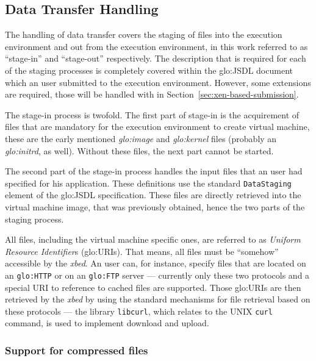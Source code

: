 \subsection{Data Transfer Handling}
\label{sec:xbed:data-transfer}

The  handling  of data  transfer  covers the  staging  of  files into  the
execution environment and out from the execution environment, in this work
referred   to  as  ``stage-in''   and  ``stage-out''   respectively.   The
description  that  is  required  for  each of  the  staging  processes  is
completely  covered  within  the  \gls{glo:JSDL} document  which  an  user
submitted  to the  execution  environment.  However,  some extensions  are
required,       those       will       be      handled       with       in
Section~\ref{sec:xen-based-submission}.

The  stage-in process  is  twofold.  The  first  part of  stage-in is  the
acquirement of files  that are mandatory for the  execution environment to
create    virtual    machine,    these    are    the    early    mentioned
\emph{\gls{glo:image}}  and  \emph{\gls{glo:kernel}}  files  (probably  an
\emph{\gls{glo:initrd}},  as well).   Without these  files, the  next part
cannot be started.

The second  part of the stage-in  process handles the input  files that an
user had specified for his application. These definitions use the standard
\texttt{DataStaging}  element of  the \gls{glo:JSDL}  specification. These
files  are directly  retrieved into  the virtual  machine image,  that was
previously obtained, hence the two parts of the staging process.

All files, including the virtual machine specific ones, are referred to as
\emph{Uniform  Resource  Identifier}s  (\gls{glo:URI}s). That  means,  all
files must be ``somehow'' accessible by the \emph{xbed}.  An user can, for
instance, specify files that  are located on an \texttt{\gls{glo:HTTP}} or
on an \texttt{\gls{glo:FTP}} server --- currently only these two protocols
and  a special  URI to  reference to  cached files  are  supported.  Those
\gls{glo:URI}s are then retrieved by the \emph{xbed} by using the standard
mechanisms for  file retrieval  based on these  protocols ---  the library
\texttt{libcurl}, which relates to the UNIX \texttt{curl} command, is used
to implement download and upload.

\subsubsection{Support for compressed files}

